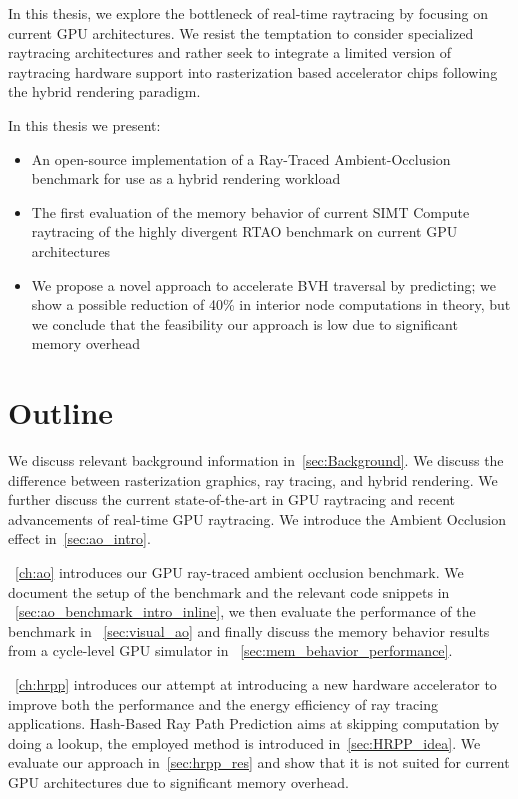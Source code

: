 In this thesis, we explore the bottleneck of real-time raytracing by focusing on current GPU architectures. We resist the temptation to consider specialized raytracing architectures and rather seek to integrate a limited version of raytracing hardware support into rasterization based accelerator chips following the hybrid rendering paradigm.

In this thesis we present:
\begin{itemize}
  \item An open-source implementation of a Ray-Traced Ambient-Occlusion benchmark for use as a hybrid rendering workload
  \item The first evaluation of the memory behavior of current SIMT Compute raytracing of the highly divergent RTAO benchmark on current GPU architectures
  \item We propose a novel approach to accelerate BVH traversal by predicting; we show a possible reduction of 40\% in interior node computations in theory, but we conclude that the feasibility our approach is low due to significant memory overhead
\end{itemize}

\section{Outline}
\label{sec:Outline}

We discuss relevant background information in~\autoref{sec:Background}. We discuss the difference between rasterization graphics, ray tracing, and hybrid rendering. We further discuss the current state-of-the-art in GPU raytracing and recent advancements of real-time GPU raytracing. We introduce the Ambient Occlusion effect in~\autoref{sec:ao_intro}.

~\autoref{ch:ao} introduces our GPU ray-traced ambient occlusion benchmark. We document the setup of the benchmark and the relevant code snippets in ~\autoref{sec:ao_benchmark_intro_inline}, we then evaluate the performance of the benchmark in ~\autoref{sec:visual_ao} and finally discuss the memory behavior results from a cycle-level GPU simulator in ~\autoref{sec:mem_behavior_performance}.

~\autoref{ch:hrpp} introduces our attempt at introducing a new hardware accelerator to improve both the performance and the energy efficiency of ray tracing applications. Hash-Based Ray Path Prediction aims at skipping computation by doing a lookup, the employed method is introduced in~\autoref{sec:HRPP_idea}. We evaluate our approach in~\autoref{sec:hrpp_res} and show that it is not suited for current GPU architectures due to significant memory overhead.

